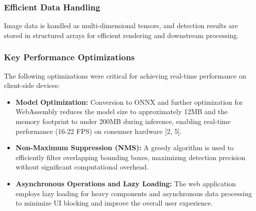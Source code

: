 \subsubsection{Efficient Data Handling}
Image data is handled as multi-dimensional tensors, and detection results are stored in structured arrays for efficient rendering and downstream processing.

\subsubsection{Key Performance Optimizations}
The following optimizations were critical for achieving real-time performance on client-side devices:
\begin{itemize}
    \item \textbf{Model Optimization:} Conversion to ONNX and further optimization for WebAssembly reduces the model size to approximately 12MB and the memory footprint to under 200MB during inference, enabling real-time performance (16-22 FPS) on consumer hardware [2, 5].
    \item \textbf{Non-Maximum Suppression (NMS):} A greedy algorithm is used to efficiently filter overlapping bounding boxes, maximizing detection precision without significant computational overhead.
    \item \textbf{Asynchronous Operations and Lazy Loading:} The web application employs lazy loading for heavy components and asynchronous data processing to minimize UI blocking and improve the overall user experience.
\end{itemize}
